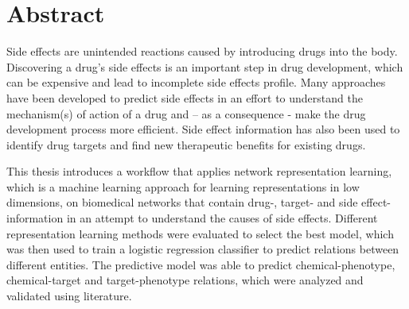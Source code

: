 \chapter*{Abstract}

Side effects are unintended reactions caused by introducing drugs into the body. Discovering a drug’s side effects is an important step in drug development, which can be expensive and lead to incomplete side effects profile. Many approaches have been developed to predict side effects in an effort to understand the mechanism(s) of action of a drug and – as a consequence - make the drug development process more efficient. Side effect information has also been used to identify drug targets and find new therapeutic benefits for existing drugs.

This thesis introduces a workflow that applies network representation learning, which is a machine learning approach for learning representations in low dimensions, on biomedical networks that contain drug-, target- and side effect-information in an attempt to understand the causes of side effects. Different representation learning methods were evaluated to select the best model, which was then used to train a logistic regression classifier to predict relations between different entities. The predictive model was able to predict chemical-phenotype, chemical-target and target-phenotype relations, which were analyzed and validated using literature. 